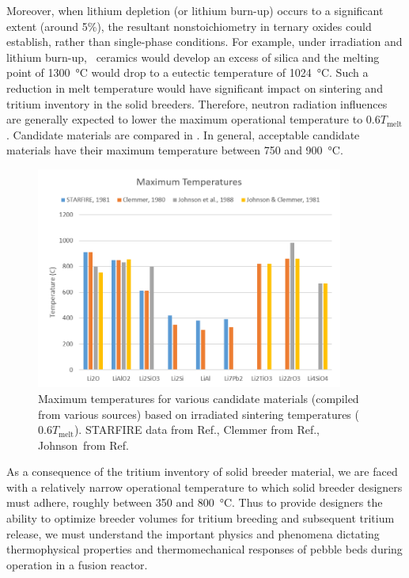 Moreover, when lithium depletion (or lithium burn-up) occurs to a significant extent (around 5\%), the resultant nonstoichiometry in ternary oxides could establish, rather than single-phase conditions. For example, under irradiation and lithium burn-up, \lis~ceramics would develop an excess of silica and the melting point of \SI{1300}{\celsius} would drop to a eutectic temperature of \SI{1024}{\celsius}. Such a reduction in melt temperature would have significant impact on sintering and tritium inventory in the solid breeders.\cite{Johnson1981} Therefore, neutron radiation influences are generally expected to lower the maximum operational temperature to $0.6 T_\text{melt}$.\cite{Johnson1981} Candidate materials are compared in . In general, acceptable candidate materials have their maximum temperature between 750 and \SI{900}{\celsius}. 

\begin{figure}[ht]
	\centering
	\includegraphics[width=0.9\textwidth]{figures/Tmax} 
	\caption{Maximum temperatures for various candidate materials (compiled from various sources) based on irradiated sintering temperatures ($0.6T_\text{melt}$). STARFIRE data from Ref.\cite{Johnson1981}, Clemmer from Ref.\cite{Clemmer1980}, Johnson\etal~from Ref.\cite{Johnson1988}}
	\label{fig:Tmax}
\end{figure}

As a consequence of the tritium inventory of solid breeder material, we are faced with a relatively narrow operational temperature to which solid breeder designers must adhere, roughly between 350 and \SI{800}{\celsius}. Thus to provide designers the ability to optimize breeder volumes for tritium breeding and subsequent tritium release, we must understand the important physics and phenomena dictating thermophysical properties and thermomechanical responses of pebble beds during operation in a fusion reactor. 


